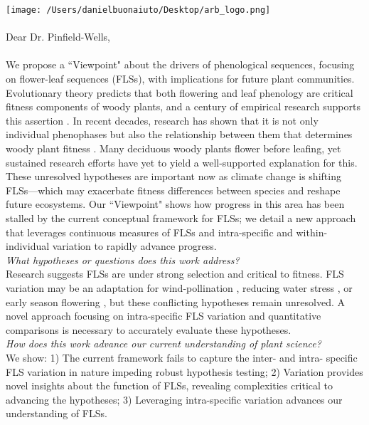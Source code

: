 \documentclass[11pt,a4paper]{article}
\begin{document}

\def\labelitemi{--}
\parindent=24pt
\texttt{[image: /Users/danielbuonaiuto/Desktop/arb\_logo.png]}
\\\\
{Dear Dr. Pinfield-Wells,}\\
\vspace{1.5ex}\\
\noindent We propose a ``Viewpoint" about the drivers of phenological sequences, focusing on flower-leaf sequences (FLSs), with implications for future plant communities. Evolutionary theory predicts that both flowering and leaf phenology are critical fitness components of woody plants, and a century of empirical research supports this assertion \citep{Munguia-Rosas2011,Forrest2010}. In recent decades, research has shown that it is not only individual phenophases but also the relationship between them that determines woody plant fitness \citep{Menzel1999,Ettinger2018}. Many deciduous woody plants flower before leafing, yet sustained research efforts have yet to yield a well-supported explanation for this. These unresolved hypotheses are important now as climate change is shifting FLSs---which may exacerbate fitness differences between species and reshape future ecosystems. Our ``Viewpoint" shows how progress in this area has been stalled by the current conceptual framework for FLSs; we detail a new approach that leverages continuous measures of FLSs and intra-specific and within-individual variation to rapidly advance progress.\\

\noindent \emph{What hypotheses or questions does this work address?}\\
\noindent Research suggests FLSs are under strong selection and critical to fitness. FLS variation may be an adaptation for wind-pollination \citep{Rathcke_1985}, reducing water stress \citep{Gougherty2018,Reich1984}, or early season flowering \citep{Primack1987}, but these conflicting hypotheses remain unresolved. A novel approach focusing on intra-specific FLS variation and quantitative comparisons is necessary to accurately evaluate these hypotheses.\\

\noindent \emph{How does this work advance our current understanding of plant science?}\\
\noindent We show: 1) The current framework fails to capture the inter- and intra- specific FLS variation in nature impeding robust hypothesis testing; 2) Variation provides novel insights about the function of FLSs, revealing complexities critical to advancing the hypotheses; 3) Leveraging intra-specific variation advances our understanding of FLSs.\\ %
\end{document}
